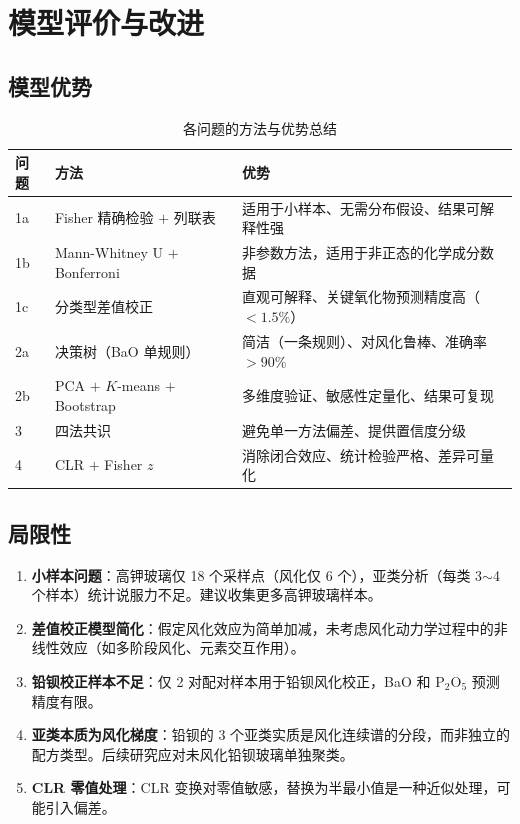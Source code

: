 \section{模型评价与改进}

\subsection{模型优势}

\begin{table}[H]
    \centering
    \caption{各问题的方法与优势总结}
    \label{tab:model_strength}
    \begin{tabular}{p{1.5cm} p{5cm} p{6cm}}
        \toprule
        \textbf{问题} & \textbf{方法} & \textbf{优势} \\
        \midrule
        1a & Fisher 精确检验 $+$ 列联表 & 适用于小样本、无需分布假设、结果可解释性强 \\
        1b & Mann-Whitney U $+$ Bonferroni & 非参数方法，适用于非正态的化学成分数据 \\
        1c & 分类型差值校正 & 直观可解释、关键氧化物预测精度高（$< 1.5\%$） \\
        2a & 决策树（BaO 单规则） & 简洁（一条规则）、对风化鲁棒、准确率 $> 90\%$ \\
        2b & PCA $+$ $K$-means $+$ Bootstrap & 多维度验证、敏感性定量化、结果可复现 \\
        3 & 四法共识 & 避免单一方法偏差、提供置信度分级 \\
        4 & CLR $+$ Fisher $z$ & 消除闭合效应、统计检验严格、差异可量化 \\
        \bottomrule
    \end{tabular}
\end{table}

\subsection{局限性}

\begin{enumerate}[label=(\arabic*)]
    \item \textbf{小样本问题}：高钾玻璃仅 18 个采样点（风化仅 6 个），亚类分析（每类 3$\sim$4 个样本）统计说服力不足。建议收集更多高钾玻璃样本。
    \item \textbf{差值校正模型简化}：假定风化效应为简单加减，未考虑风化动力学过程中的非线性效应（如多阶段风化、元素交互作用）。
    \item \textbf{铅钡校正样本不足}：仅 2 对配对样本用于铅钡风化校正，BaO 和 $\text{P}_2\text{O}_5$ 预测精度有限。
    \item \textbf{亚类本质为风化梯度}：铅钡的 3 个亚类实质是风化连续谱的分段，而非独立的配方类型。后续研究应对未风化铅钡玻璃单独聚类。
    \item \textbf{CLR 零值处理}：CLR 变换对零值敏感，替换为半最小值是一种近似处理，可能引入偏差。
\end{enumerate}

